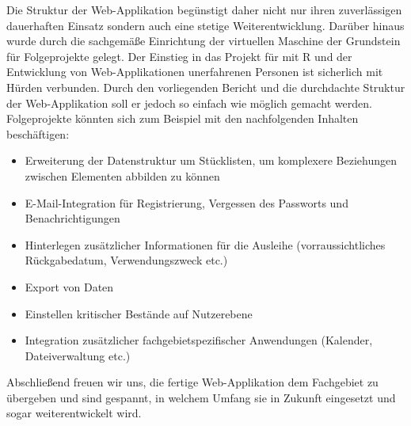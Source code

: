 \documentclass[
]{article}
\providecommand{\tightlist}{%
  \setlength{\itemsep}{0pt}\setlength{\parskip}{0pt}}
\begin{document}
Die Struktur der Web-Applikation begünstigt daher nicht nur ihren zuverlässigen dauerhaften Einsatz sondern auch eine stetige Weiterentwicklung. Darüber hinaus wurde durch die sachgemäße Einrichtung der virtuellen Maschine der Grundstein für Folgeprojekte gelegt. Der Einstieg in das Projekt für mit R und der Entwicklung von Web-Applikationen unerfahrenen Personen ist sicherlich mit Hürden verbunden. Durch den vorliegenden Bericht und die durchdachte Struktur der Web-Applikation soll er jedoch so einfach wie möglich gemacht werden. Folgeprojekte könnten sich zum Beispiel mit den nachfolgenden Inhalten beschäftigen:

\begin{itemize}
\tightlist
\item
  Erweiterung der Datenstruktur um Stücklisten, um komplexere Beziehungen zwischen Elementen abbilden zu können
\item
  E-Mail-Integration für Registrierung, Vergessen des Passworts und Benachrichtigungen
\item
  Hinterlegen zusätzlicher Informationen für die Ausleihe (vorraussichtliches Rückgabedatum, Verwendungszweck etc.)
\item
  Export von Daten
\item
  Einstellen kritischer Bestände auf Nutzerebene
\item
  Integration zusätzlicher fachgebietspezifischer Anwendungen (Kalender, Dateiverwaltung etc.)
\end{itemize}

Abschließend freuen wir uns, die fertige Web-Applikation dem Fachgebiet zu übergeben und sind gespannt, in welchem Umfang sie in Zukunft eingesetzt und sogar weiterentwickelt wird.

\clearpage


\null


\printbibliography
\end{document}
